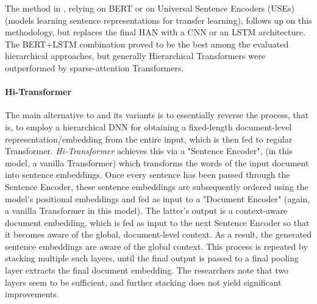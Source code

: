 \documentclass[preprint,review,12pt]{elsarticle}
\begin{document}
The method in \citet{khandve}, relying on BERT or on Universal Sentence Encoders (USEs) \cite{use} (models learning sentence representations for transfer learning), follows up on this methodology, but replaces the final HAN with a CNN or an LSTM architecture. The BERT+LSTM combination proved to be the best among the evaluated hierarchical approaches, but generally Hierarchical Transformers were outperformed by sparse-attention Transformers.



\paragraph{Hi-Transformer} The main alternative to \citet{glue_gunner} and its variants is to essentially reverse the process, that is, to employ a hierarchical DNN for obtaining a fixed-length document-level representation/embedding from the entire input, which is then fed to regular Transformer. \textit{Hi-Transformer} \cite{qi} achieves this via a "Sentence Encoder", (in this model, a vanilla Transformer) which transforms the words of the input document into sentence embeddings. Once every sentence has been passed through the Sentence Encoder, these sentence embeddings are subsequently ordered using the model's positional embeddings and fed as input to a "Document Encoder" (again, a vanilla Transformer in this model). The latter's output is a context-aware document embedding, which is fed as input to the next Sentence Encoder so that it becomes aware of the global, document-level context. As a result, the generated sentence embeddings are aware of the global context. This process is repeated by stacking multiple such layers, until the final output is passed to a final pooling layer extracts the final document embedding. The researchers note that two layers seem to be sufficient, and further stacking does not yield significant improvements. %
\end{document}
